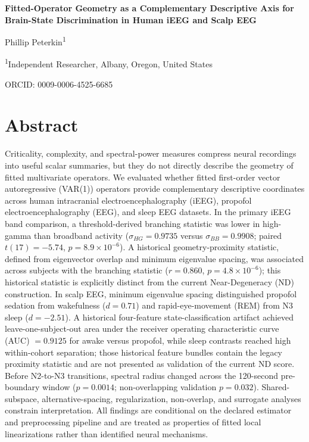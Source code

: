 \documentclass[preprint,12pt,nonatbib]{elsarticle}
\begin{document}
\begin{center}
{\Large\bfseries Fitted-Operator Geometry as a Complementary Descriptive Axis for Brain-State Discrimination in Human iEEG and Scalp EEG\par}
\vspace{6pt}
{\normalsize Phillip Peterkin\textsuperscript{1}\par}
\vspace{3pt}
{\footnotesize \textsuperscript{1}Independent Researcher, Albany, Oregon, United States\par}
\vspace{3pt}
{\footnotesize ORCID: 0009-0006-4525-6685\par}
\end{center}

\section*{Abstract}
Criticality, complexity, and spectral-power measures compress neural recordings into useful scalar summaries, but they do not directly describe the geometry of fitted multivariate operators. We evaluated whether fitted first-order vector autoregressive (VAR(1)) operators provide complementary descriptive coordinates across human intracranial electroencephalography (iEEG), propofol electroencephalography (EEG), and sleep EEG datasets. In the primary iEEG band comparison, a threshold-derived branching statistic was lower in high-gamma than broadband activity ($\sigma_{HG}=0.9735$ versus $\sigma_{BB}=0.9908$; paired $t(17)=-5.74$, $p=8.9\times10^{-6}$). A historical geometry-proximity statistic, defined from eigenvector overlap and minimum eigenvalue spacing, was associated across subjects with the branching statistic ($r=0.860$, $p=4.8\times10^{-6}$); this historical statistic is explicitly distinct from the current Near-Degeneracy (ND) construction. In scalp EEG, minimum eigenvalue spacing distinguished propofol sedation from wakefulness ($d=0.71$) and rapid-eye-movement (REM) from N3 sleep ($d=-2.51$). A historical four-feature state-classification artifact achieved leave-one-subject-out area under the receiver operating characteristic curve (AUC) $=0.9125$ for awake versus propofol, while sleep contrasts reached high within-cohort separation; those historical feature bundles contain the legacy proximity statistic and are not presented as validation of the current ND score. Before N2-to-N3 transitions, spectral radius changed across the 120-second pre-boundary window ($p=0.0014$; non-overlapping validation $p=0.032$). Shared-subspace, alternative-spacing, regularization, non-overlap, and surrogate analyses constrain interpretation. All findings are conditional on the declared estimator and preprocessing pipeline and are treated as properties of fitted local linearizations rather than identified neural mechanisms.
\end{document}
